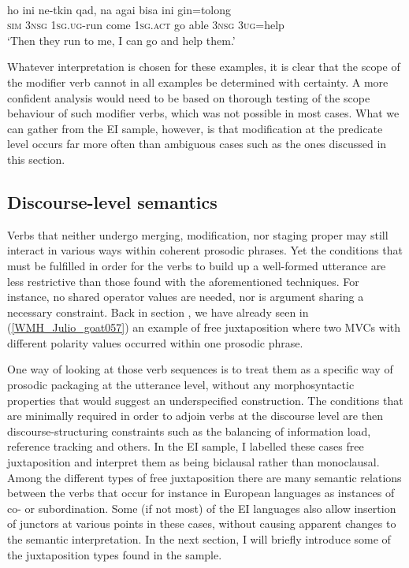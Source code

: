 \ea \label{Klon_61} 
\\
\gll ho ini ne-tkin qad, na agai bisa ini gin=tolong \\
\textsc{sim} 3\textsc{nsg} 1\textsc{sg}.\textsc{ug}-run come 1\textsc{sg}.\textsc{act} go able 3\textsc{nsg} 3\textsc{ug}=help \\
\glft `Then they run to me, I can go and help them.' \\ 
\z

Whatever interpretation is chosen for these examples, it is clear that the scope of the modifier verb cannot in all examples be determined with certainty. A more confident analysis would need to be based on thorough testing of the scope behaviour of such modifier verbs, which was not possible in most cases. What we can gather from the EI sample, however, is that modification at the predicate level occurs far more often than ambiguous cases such as the ones discussed in this section.

\subsection{Discourse-level semantics} \label{sec:discourse-level}

Verbs that neither undergo merging, modification, nor staging proper may still interact in various ways within coherent prosodic phrases. Yet the conditions that must be fulfilled in order for the verbs to build up a well-formed utterance are less restrictive than those found with the aforementioned techniques. For instance, no shared operator values are needed, nor is argument sharing a necessary constraint. Back in section , we have already seen in (\ref{WMH_Julio_goat057}) an example of free juxtaposition where two MVCs with different polarity values occurred within one prosodic phrase. 

One way of looking at those verb sequences is to treat them as a specific way of prosodic packaging at the utterance level, without any morphosyntactic properties that would suggest an underspecified construction. The conditions that are minimally required in order to adjoin verbs at the discourse level are then discourse-structuring constraints such as the balancing of information load, reference tracking and others. In the EI sample, I labelled these cases free juxtaposition and interpret them as being biclausal rather than monoclausal. Among the different types of free juxtaposition there are many semantic relations between the verbs that occur for instance in European languages as instances of co- or subordination. Some (if not most) of the EI languages also allow insertion of junctors at various points in these cases, without causing apparent changes to the semantic interpretation. In the next section, I will briefly introduce some of the juxtaposition types found in the sample.

